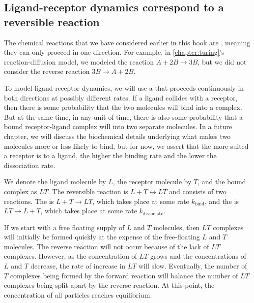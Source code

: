 \FloatBarrier
\nopagebreak
{}
\subsection{Ligand-receptor dynamics correspond to a reversible reaction}

The chemical reactions that we have considered earlier in this book are , meaning they can only proceed in one direction. For example, in \autoref{chapter:turing}'s reaction-diffusion model, we modeled the reaction $A + 2B \rightarrow 3B$, but we did not consider the reverse reaction $3B \rightarrow A + 2B$.

To model ligand-receptor dynamics, we will use a  that proceeds continuously in both directions at possibly different rates. If a ligand collides with a receptor, then there is some probability that the two molecules will bind into a complex. But at the same time, in any unit of time, there is also some probability that a bound receptor-ligand complex will  into two separate molecules. In a future chapter, we will discuss the biochemical details underlying what makes two molecules more or less likely to bind, but for now, we assert that the more suited a receptor is to a ligand, the higher the binding rate and the lower the dissociation rate.\\

\begin{note}\end{note}

We denote the ligand molecule by $L$, the receptor molecule by $T$, and the bound complex as $LT$. The reversible reaction is $L + T \longleftrightarrow LT$ and consists of two reactions. The  is $L + T \rightarrow LT$, which takes place at some rate $k_\text{bind}$, and the  is $LT \rightarrow L + T$, which takes place at some rate $k_\text{dissociate}$.

If we start with a free floating supply of $L$ and $T$ molecules, then $LT$ complexes will initially be formed quickly at the expense of the free-floating $L$ and $T$ molecules. The reverse reaction will not occur because of the lack of $LT$ complexes. However, as the concentration of $LT$ grows and the concentrations of $L$ and $T$ decrease, the rate of increase in $LT$ will slow. Eventually, the number of $T$ complexes being formed by the forward reaction will balance the number of $LT$ complexes being split apart by the reverse reaction. At this point, the concentration of all particles reaches equilibrium.

